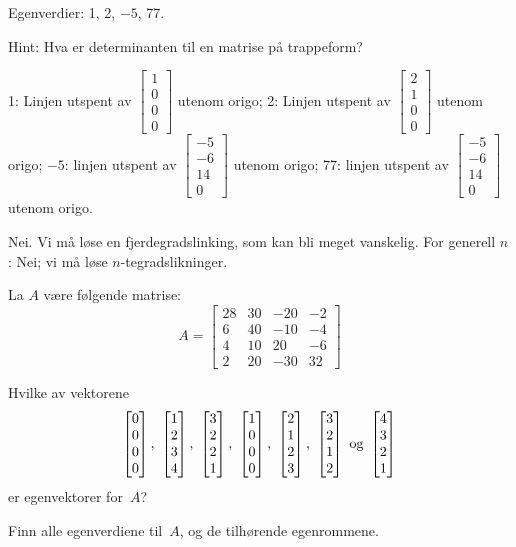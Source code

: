 \begin{losning}

\begin{punkt}
Egenverdier: 1, 2, $-5$, 77. 

\noindent
Hint: Hva er determinanten til en matrise på trappeform?
\end{punkt}

\begin{punkt}

1: Linjen utspent av $\begin{bmatrix}
1\\
0\\
0\\
0
\end{bmatrix}$ utenom origo; 2: Linjen utspent av $\begin{bmatrix}
2\\
1\\
0\\
0
\end{bmatrix}$ utenom origo; $-5$: linjen utspent av $\begin{bmatrix}
-5\\
-6\\
14\\
0
\end{bmatrix}$ utenom origo; 77: linjen utspent av $\begin{bmatrix}
-5\\
-6\\
14\\
0
\end{bmatrix}$ utenom origo.

\end{punkt}

\begin{punkt}
Nei. Vi må løse en fjerdegradslinking, som kan bli meget vanskelig. For generell $n$: Nei; vi må løse $n$-tegradslikninger.
\end{punkt}

\end{losning}


\begin{oppgave}
La $A$ være følgende matrise:
\[
A =
\begin{bmatrix}
 28 & 30 & -20 & -2 \\
 6 & 40 & -10 & -4 \\
 4 & 10 & 20 & -6 \\
 2 & 20 & -30 & 32
\end{bmatrix}
\]
\begin{punkt}
Hvilke av vektorene
\[
\vvvv{0}{0}{0}{0},\ %
\vvvv{1}{2}{3}{4},\ %
\vvvv{3}{2}{2}{1},\ %
\vvvv{1}{0}{0}{0},\ %
\vvvv{2}{1}{2}{3},\ %
\vvvv{3}{2}{1}{2}\ \text{og}\ %
\vvvv{4}{3}{2}{1}
\]
er egenvektorer for~$A$?
\end{punkt}
\begin{punkt}
Finn alle egenverdiene til~$A$, og de tilhørende egenrommene.
\end{punkt}
\end{oppgave}

